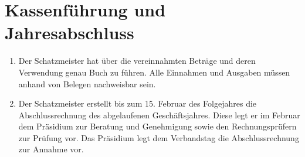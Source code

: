 \documentclass[fontsize=12pt, paper=a4, ngerman]{article}
\begin{document}
\section{Kassenführung und Jahresabschluss}
\begin{enumerate}
\item Der Schatzmeister hat über die vereinnahmten Beträge und deren Verwendung genau
Buch zu führen. Alle Einnahmen und Ausgaben müssen anhand von Belegen nachweisbar
sein.
\item Der Schatzmeister erstellt bis zum 15. Februar des Folgejahres die Abschlussrechnung
des abgelaufenen Geschäftsjahres. Diese legt er im Februar dem Präsidium zur Beratung
und Genehmigung sowie den Rechnungsprüfern zur Prüfung vor. Das Präsidium legt dem
Verbandstag die Abschlussrechnung zur Annahme vor.
\end{enumerate}
\end{document}
